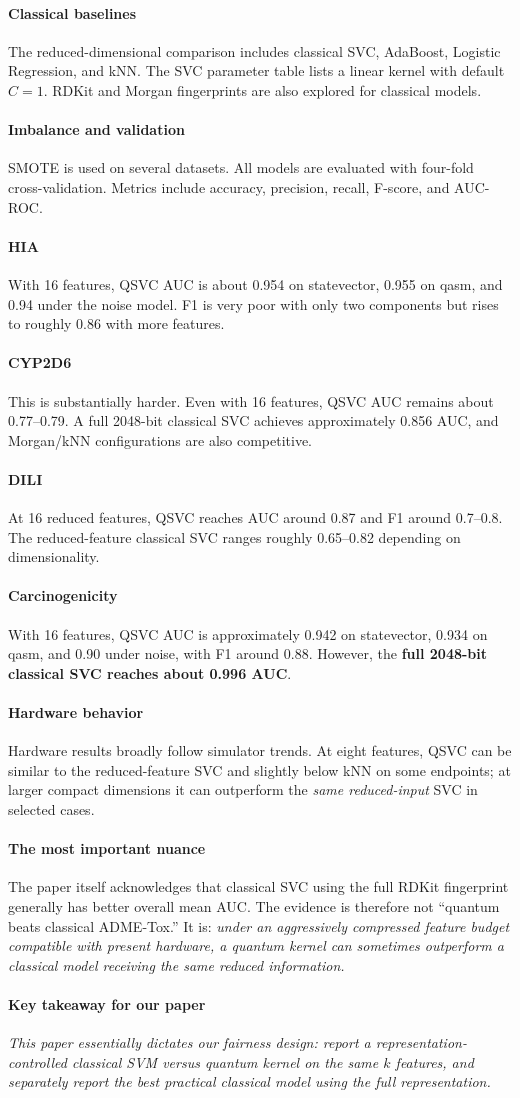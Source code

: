 \documentclass[11pt]{article}
\newcommand{\reviewfield}[2]{\paragraph{#1}#2}
\newcommand{\keytakeaway}[1]{\paragraph{Key takeaway for our paper}\emph{#1}}
\begin{document}
\reviewfield{Classical baselines}{
The reduced-dimensional comparison includes classical SVC, AdaBoost, Logistic Regression, and kNN. The SVC parameter table lists a linear kernel with default $C=1$. RDKit and Morgan fingerprints are also explored for classical models.
}

\reviewfield{Imbalance and validation}{
SMOTE is used on several datasets. All models are evaluated with four-fold cross-validation. Metrics include accuracy, precision, recall, F-score, and AUC-ROC.
}

\reviewfield{HIA}{
With 16 features, QSVC AUC is about 0.954 on statevector, 0.955 on qasm, and 0.94 under the noise model. F1 is very poor with only two components but rises to roughly 0.86 with more features.
}

\reviewfield{CYP2D6}{
This is substantially harder. Even with 16 features, QSVC AUC remains about 0.77--0.79. A full 2048-bit classical SVC achieves approximately 0.856 AUC, and Morgan/kNN configurations are also competitive.
}

\reviewfield{DILI}{
At 16 reduced features, QSVC reaches AUC around 0.87 and F1 around 0.7--0.8. The reduced-feature classical SVC ranges roughly 0.65--0.82 depending on dimensionality.
}

\reviewfield{Carcinogenicity}{
With 16 features, QSVC AUC is approximately 0.942 on statevector, 0.934 on qasm, and 0.90 under noise, with F1 around 0.88. However, the \textbf{full 2048-bit classical SVC reaches about 0.996 AUC}.
}

\reviewfield{Hardware behavior}{
Hardware results broadly follow simulator trends. At eight features, QSVC can be similar to the reduced-feature SVC and slightly below kNN on some endpoints; at larger compact dimensions it can outperform the \emph{same reduced-input} SVC in selected cases.
}

\reviewfield{The most important nuance}{
The paper itself acknowledges that classical SVC using the full RDKit fingerprint generally has better overall mean AUC. The evidence is therefore not ``quantum beats classical ADME-Tox.'' It is: \emph{under an aggressively compressed feature budget compatible with present hardware, a quantum kernel can sometimes outperform a classical model receiving the same reduced information.}
}

\keytakeaway{This paper essentially dictates our fairness design: report a representation-controlled classical SVM versus quantum kernel on the same $k$ features, and separately report the best practical classical model using the full representation.}
\end{document}
